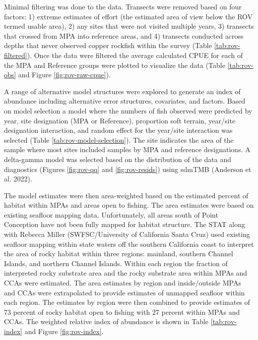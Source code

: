 \documentclass[11pt,
  english,
  letterpaper,
]{article}
\begin{document}
Minimal filtering was done to the data. Transects were removed based on four factors: 1) extreme estimates of effort (the estimated area of view below the ROV termed usable area), 2) any sites that were not visited multiple years, 3) transects that crossed from MPA into reference areas, and 4) transects conducted across depths that never observed copper rockfish within the survey (Table \ref{tab:rov-filtered}). Once the data were filtered the average calculated CPUE for each of the MPA and Reference groups were plotted to visualize the data (Table \ref{tab:rov-obs} and Figure \ref{fig:rov-raw-cpue}).

A range of alternative model structures were explored to generate an index of abundance including alternative error structures, covariates, and factors. Based on model selection a model where the numbers of fish observed were predicted by year, site designation (MPA or Reference), proportion soft terrain, year/site designation interaction, and random effect for the year/site interaction was selected (Table \ref{tab:rov-model-selection}). The site indicates the area of the sample where most sites included samples by MPA and reference designations. A delta-gamma model was selected based on the distribution of the data and diagnostics (Figures \ref{fig:rov-qq} and \ref{fig:rov-resids}) using sdmTMB (Anderson et al. 2022).

The model estimates were then area-weighted based on the estimated percent of habitat within MPAs and areas open to fishing. The area estimates were based on existing seafloor mapping data. Unfortunately, all areas south of Point Conception have not been fully mapped for habitat structure. The STAT along with Rebecca Miller (SWFSC/University of California Santa Cruz) used existing seafloor mapping within state waters off the southern California coast to interpret the area of rocky habitat within three regions: mainland, southern Channel Islands, and northern Channel Islands. Within each region the fraction of interpreted rocky substrate area and the rocky substrate area within MPAs and CCAs were estimated. The area estimates by region and inside/outside MPAs and CCAs were extrapolated to provide estimates of unmapped seafloor within each region. The estimates by region were then combined to provide estimates of 73 percent of rocky habitat open to fishing with 27 percent within MPAs and CCAs. The weighted relative index of abundance is shown in Table \ref{tab:rov-index} and Figure \ref{fig:rov-index}.

\newpage
\end{document}
